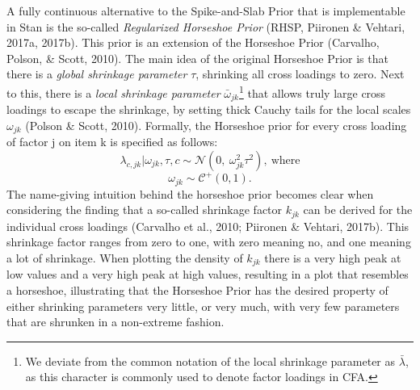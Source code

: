 \documentclass[
  man, donotrepeattitle,floatsintext]{apa6}
\begin{document}
A fully continuous alternative to the Spike-and-Slab Prior that is
implementable in Stan is the so-called \emph{Regularized Horseshoe Prior}
(RHSP, Piironen \& Vehtari, 2017a, 2017b). This prior
is an extension of the Horseshoe Prior (Carvalho, Polson, \& Scott, 2010). The
main idea of the original Horseshoe Prior is that there is a \emph{global
shrinkage parameter} \(\tau\), shrinking all cross loadings to zero. Next
to this, there is a \emph{local shrinkage parameter} \(\bar{\omega}_{jk}\)\footnote{We deviate from the common notation of the local shrinkage
  parameter as \(\bar{\lambda}\), as this character is commonly used to
  denote factor loadings in CFA.}
that allows truly large cross loadings to escape the shrinkage, by
setting thick Cauchy tails for the local scales \(\omega_{jk}\)
(Polson \& Scott, 2010). Formally, the Horseshoe prior for every cross
loading of factor j on item k is specified as follows:
\[\lambda_{c,jk} | \omega_{jk}, \tau, c\sim \mathcal{N}(0, \ \omega^2_{jk} \tau^2), \ \text{where}\]
\[\omega_{jk} \sim \mathcal{C^+}(0, 1).\] The name-giving intuition
behind the horseshoe prior becomes clear when considering the finding
that a so-called shrinkage factor \(k_{jk}\) can be derived for the
individual cross loadings (Carvalho et al., 2010; Piironen \& Vehtari, 2017b). This shrinkage factor ranges from zero to one,
with zero meaning no, and one meaning a lot of shrinkage. When plotting
the density of \(k_{jk}\) there is a very high peak at low values and a
very high peak at high values, resulting in a plot that resembles a
horseshoe, illustrating that the Horseshoe Prior has the desired
property of either shrinking parameters very little, or very much, with
very few parameters that are shrunken in a non-extreme fashion.
\end{document}
